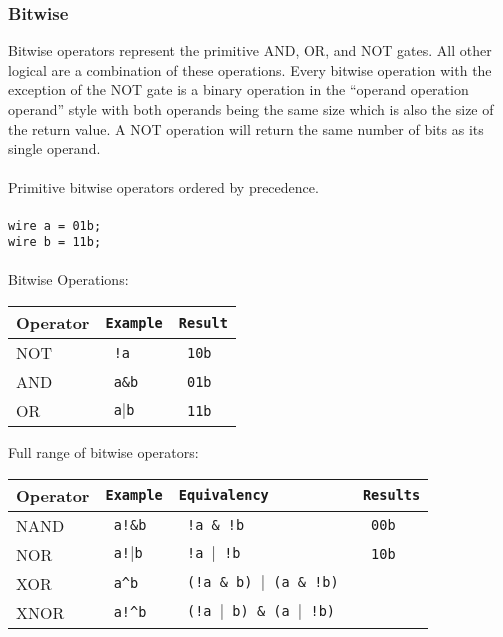 \documentclass[letterpaper,11pt]{article}
\begin{document}
        \subsubsection{Bitwise}
        Bitwise operators represent the primitive AND, OR, and NOT gates. All other logical are a combination 
        of these operations. Every bitwise operation with the exception of the NOT gate is a binary operation 
        in the “operand operation operand” style with both operands being the same size which is also the 
        size of the return value. A NOT operation will return the same number of bits as its single operand. \\\\
        Primitive bitwise operators ordered by precedence. \\\\
        \texttt{wire a = 01b;} \\
        \texttt{wire b = 11b;} \\\\
        Bitwise Operations: \\
        
        \begin{center}
        \begin{tabular}{|l|>{\texttt\bgroup}l<{\egroup}|>{\texttt\bgroup}l<{\egroup}|}
        \hline
        Operator&Example&Result\\ \hline
        NOT		&	!a		&	10b\\ \hline
        AND		&	a\&b		&	01b\\ \hline
        OR		&	a$\mid$b	&	11b\\ \hline
        \end{tabular}
        \end{center} 
        Full range of bitwise operators: \\
         
        \begin{center} 
        \begin{tabular}{|l|>{\texttt\bgroup}l<{\egroup}|>{\texttt\bgroup}l<{\egroup}|>{\texttt\bgroup}l<{\egroup}|}
        \hline
        Operator&Example&Equivalency&Results\\ \hline
        NAND	&	a!\&b				&		!a \& !b				&	00b		\\ \hline
        NOR		&	a!$\mid$b			&		!a $\mid$ !b			&	10b		\\ \hline
        XOR		&	a\textasciicircum b	&	(!a \& b) $\mid$ (a \& !b)		&			\\ \hline
        XNOR	&	a!\textasciicircum b 	&	(!a $\mid$ b) \& (a $\mid$ !b) 	& 			\\ \hline
        \end{tabular}
        \end{center} 
        
\end{document}
